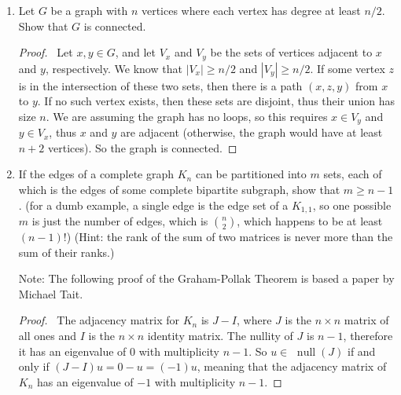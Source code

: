 \documentclass[12pt]{article}
\DeclareMathOperator{\rank}{rank}
\DeclareMathOperator{\Null}{null}
\begin{document}
\begin{enumerate}[leftmargin=0cm,itemindent=.5cm,labelwidth=\itemindent,labelsep=0cm,align=left]
\begin{proof}
We always have that $\rank(XY) \leq \rank(X)$, thus $\rank(AA^T) \leq \rank(A)$.  Also, the rank of an $n \times m$ matrix can exceed neither $m$ nor $n$.  Therefore,
$$
n \geq \rank(A) \geq \rank(AA^T) =
\begin{cases}
m & \text{if } m \text{ is odd} \\
m-1 & \text{if } m \text { is even}
\end{cases}.
$$
\end{proof}

\item Let $G$ be a graph with $n$ vertices where each vertex has degree at least $n/2$.  Show that $G$ is connected.

\begin{proof}
\ Let $x,y \in G$, and let $V_x$ and $V_y$ be the sets of vertices adjacent to $x$ and $y$, respectively.  We know that $|V_x| \geq n/2$ and $|V_y| \geq n/2$.  If some vertex $z$ is in the intersection of these two sets, then there is a path $(x,z,y)$ from $x$ to $y$.  If no such vertex exists, then these sets are disjoint, thus their union has size $n$.  We are assuming the graph has no loops, so this requires $x \in V_y$ and $y \in V_x$, thus $x$ and $y$ are adjacent (otherwise, the graph would have at least $n+2$ vertices).  So the graph is connected.
\end{proof}

\item If the edges of a complete graph $K_n$ can be partitioned into $m$ sets, each of which is the edges of some complete bipartite subgraph, show that $m \geq n-1$.  (for a dumb example, a single edge is the edge set of a $K_{1,1}$, so one possible $m$ is just the number of edges, which is $\binom{n}{2}$, which happens to be at least $(n-1)!$)  (Hint: the rank of the sum of two matrices is never more than the sum of their ranks.)

\noindent Note: The following proof of the Graham-Pollak Theorem is based a paper by Michael Tait.

\begin{proof}

\ The adjacency matrix for $K_n$ is $J - I$, where $J$ is the $n \times n$ matrix of all ones and $I$ is the $n \times n$ identity matrix.  The nullity of $J$ is $n-1$, therefore it has an eigenvalue of $0$ with multiplicity $n-1$.  So $u \in$ $\Null(J)$ if and only if $(J-I)u = 0 - u = (-1)u$, meaning that the adjacency matrix of $K_n$ has an eigenvalue of $-1$ with multiplicity $n-1$.


\end{proof}
\end{enumerate}
\end{document}
